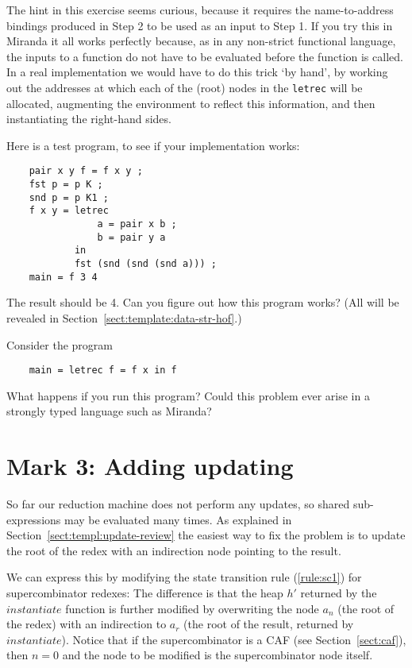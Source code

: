 The hint in this exercise
seems curious, because it requires the name-to-address bindings produced in
Step 2 to be used as an input to Step 1.
If you try this in Miranda it all works perfectly because,
as in any non-strict functional language, the inputs to a function do
not have to be evaluated before the function is called.
In a real implementation we would have to do this trick `by hand',
by working out the addresses at which each of the (root) nodes in
the \mbox{\tt letrec} will be allocated, augmenting the environment to
reflect this information, and then instantiating the right-hand sides.

Here is a test program, to see if your implementation works:
\begin{verbatim}
    pair x y f = f x y ;
    fst p = p K ;
    snd p = p K1 ;
    f x y = letrec
                a = pair x b ;
                b = pair y a
            in
            fst (snd (snd (snd a))) ;
    main = f 3 4
\end{verbatim}
The result should be 4.
Can you figure out how this program works?  (All will be revealed in
Section~\ref{sect:template:data-str-hof}.)

\begin{exercise}
Consider the program
\begin{verbatim}
    main = letrec f = f x in f
\end{verbatim}
What happens if you run this program?  Could this problem ever arise
in a strongly typed language such as Miranda?
\end{exercise}

\section{Mark 3: Adding updating}
\label{sect:templ:update}

So far our reduction machine does not perform any
updates,
so shared sub-expressions may be evaluated many times.
As explained in Section~\ref{sect:templ:update-review}
the easiest way to fix the problem is to update the root of the
redex with an indirection node pointing to the result.

We can express this by modifying the state transition rule (\ref{rule:sc1})
for supercombinator redexes:
\label{rule:sc2}
The difference is that the heap $h'$ returned by the
$instantiate$ function is further modified by overwriting the node $a_n$
(the root of the redex) with an indirection to $a_r$ (the root of the result,
returned by $instantiate$).  Notice that if the supercombinator is
a CAF
(see Section~\ref{sect:caf}), then $n=0$ and the node to be modified is
the supercombinator node itself.

